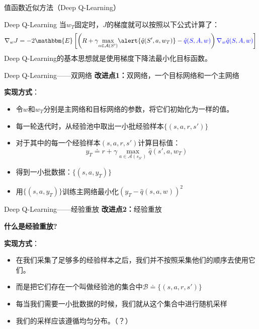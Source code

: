 \begin{section}{值函数近似方法\alert{（Deep Q-Learning）}}
\begin{frame}{Deep Q-Learning}
    当$w_T$固定时，$J$的梯度就可以按照以下公式计算了：
    \[
        \nabla_wJ=-2\mathbbm{E}\left[\left(R+\gamma \underset{a\in \mathcal{A}(S')}{\max}\alert{\hat{q}(S',a,w_T)}-\textcolor{blue}{\hat{q}(S,A,w)}\right) \textcolor{blue}{\nabla_w\hat{q}(S,A,w)}\right]
    \]
    Deep Q-Learning的基本思想就是使用梯度下降法最小化目标函数。
\end{frame}

\begin{frame}{Deep Q-Learning——双网络}
    \textbf{改进点1：}\alert{双网络，一个目标网络和一个主网络}

    \textbf{实现方式}：
    \begin{itemize}
        \item 令$w$和$w_T$分别是主网络和目标网络的参数，将它们初始化为一样的值。
        \item 每一轮迭代时，从经验池中取出一小批经验样本$\{(s,a,r,s')\}$
        \item 对于其中的每一个经验样本$(s,a,r,s')$计算目标值：
        \[
            y_T\doteq r+\gamma \underset{a\in \mathcal{A}(s_{S'})}{\max}\hat{q}(s',a,w_T)
        \]
        \item 得到一小批数据：$\{(s,a,y_T)\}$
        \item 用$\{(s,a,y_T)\}$训练主网络最小化$(y_T-\hat{q}(s,a,w))^2$
    \end{itemize}
\end{frame}

\begin{frame}{Deep Q-Learning——经验重放}
    \textbf{改进点2：}\alert{经验重放}

    \textbf{什么是经验重放?}

    \textbf{实现方式}：
    \begin{itemize}
        \item 在我们采集了足够多的经验样本之后，我们\alert{并不按照采集他们的顺序去使用它们}。
        \item 而是把它们存在一个叫做\alert{经验池}的集合中\alert{$\mathcal{B}\doteq\{(s,a,r,s')\}$}
        \item 每当我们需要一小批数据的时候，我们就从这个集合中进行随机采样
        \item 我们的采样应该遵循均匀分布。（？）
    \end{itemize}
\end{frame}


\end{section}
